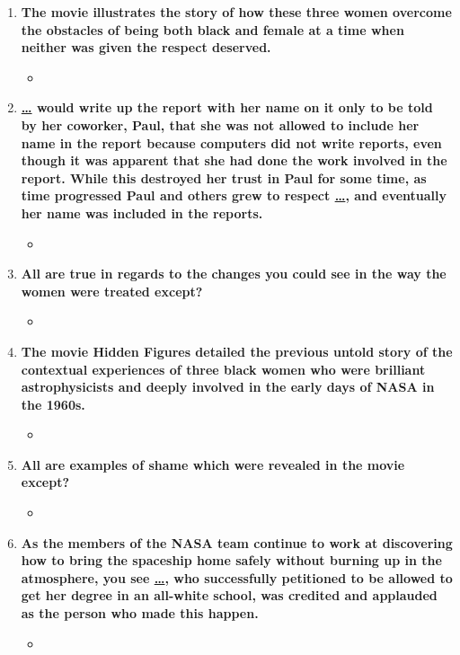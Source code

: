\documentclass[12pt,a4paper]{article}
\begin{document}
\begin{enumerate}
    \item \textbf{The movie illustrates the story of how these three women overcome the obstacles of being both black and female at a time when neither was given the respect deserved.}
    \begin{itemize}
      \item {}
    \end{itemize}
    \item \textbf{\underline{\ldots} would write up the report with her name on it only to be told by her coworker, Paul, that she was not allowed to include her name in the report because computers did not write reports, even though it was apparent that she had done the work involved in the report. While this destroyed her trust in Paul for some time, as time progressed Paul and others grew to respect \underline{\ldots}, and eventually her name was included in the reports.}
    \begin{itemize}
      \item {}
    \end{itemize}
    \item \textbf{All are true in regards to the changes you could see in the way the women were treated except?}
    \begin{itemize}
      \item {}
    \end{itemize}
    \item \textbf{The movie Hidden Figures detailed the previous untold story of the contextual experiences of three black women who were brilliant astrophysicists and deeply involved in the early days of NASA in the 1960s.}
    \begin{itemize}
      \item {}
    \end{itemize}
    \item \textbf{All are examples of shame which were revealed in the movie except?}
    \begin{itemize}
      \item {}
    \end{itemize}
    \item \textbf{As the members of the NASA team continue to work at discovering how to bring the spaceship home safely without burning up in the atmosphere, you see \underline{\ldots}, who successfully petitioned to be allowed to get her degree in an all-white school, was credited and applauded as the person who made this happen.}
    \begin{itemize}
      \item {}
    \end{itemize}
  \end{enumerate}
\end{document}
